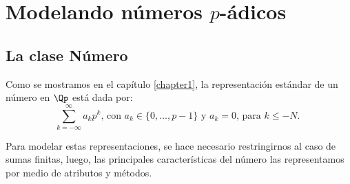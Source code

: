 \chapter{Modelando números $p$-ádicos}
\label{chapter2}





\section{La clase Número}
Como se mostramos en el capítulo \ref{chapter1}, la representación estándar de un número en $\Qp$ está dada por:
\begin{equation}
\sum_{k=-\infty}^{\infty} a_{k} p^{k}\text{, con $a_k\in\{0,\dots,p-1\}$ y $a_k=0$, para $k\leq - N$. 
}	\label{num_rep}
\end{equation}

Para modelar estas representaciones, se hace necesario restringirnos al caso de sumas finitas, luego, las principales características del número las representamos por medio de atributos y métodos.

